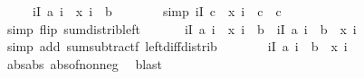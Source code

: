 \begin{isabellebody}
\ \ \ \ \ {\isachardoublequoteopen}{\isasymbar}{\isacharparenleft}{\kern0pt}{\isasymSum}i{\isasymin}I{\isachardot}{\kern0pt}\ a\ i\ {\isacharasterisk}{\kern0pt}\ x\ i{\isacharparenright}{\kern0pt}\ {\isacharminus}{\kern0pt}\ b{\isasymbar}\ {\isasymle}\ {\isasymdelta}{\isachardoublequoteclose}\isanewline
%
\isadelimproof
%
\endisadelimproof
%
\isatagproof
{}\isamarkupfalse%
\ {\isacharminus}{\kern0pt}\isanewline
\ \ \isamarkupfalse%
\ {\isacharbrackleft}{\kern0pt}simp{\isacharbrackright}{\kern0pt}{\isacharcolon}{\kern0pt}\ {\isachardoublequoteopen}{\isacharparenleft}{\kern0pt}{\isasymSum}i{\isasymin}I{\isachardot}{\kern0pt}\ c\ {\isacharasterisk}{\kern0pt}\ x\ i{\isacharparenright}{\kern0pt}\ {\isacharequal}{\kern0pt}\ c{\isachardoublequoteclose}\ \ c\isanewline
\ \ \ \ \isamarkupfalse%
\ {\isacharparenleft}{\kern0pt}simp\ flip{\isacharcolon}{\kern0pt}\ sum{\isacharunderscore}{\kern0pt}distrib{\isacharunderscore}{\kern0pt}left\ {}{\isacharparenright}{\kern0pt}\isanewline
\ \ \isamarkupfalse%
\ \isamarkupfalse%
\ {\isachardoublequoteopen}{\isasymbar}{\isacharparenleft}{\kern0pt}{\isasymSum}i{\isasymin}I{\isachardot}{\kern0pt}\ a\ i\ {\isacharasterisk}{\kern0pt}\ x\ i{\isacharparenright}{\kern0pt}\ {\isacharminus}{\kern0pt}\ b{\isasymbar}\ {\isacharequal}{\kern0pt}\ {\isasymbar}{\isasymSum}i{\isasymin}I{\isachardot}{\kern0pt}\ {\isacharparenleft}{\kern0pt}a\ i\ {\isacharminus}{\kern0pt}\ b{\isacharparenright}{\kern0pt}\ {\isacharasterisk}{\kern0pt}\ x\ i{\isasymbar}{\isachardoublequoteclose}\isanewline
\ \ \ \ \isamarkupfalse%
\ {\isacharparenleft}{\kern0pt}simp\ add{\isacharcolon}{\kern0pt}\ sum{\isacharunderscore}{\kern0pt}subtractf\ left{\isacharunderscore}{\kern0pt}diff{\isacharunderscore}{\kern0pt}distrib{\isacharparenright}{\kern0pt}\isanewline
\ \ \isamarkupfalse%
\ \isamarkupfalse%
\ {\isachardoublequoteopen}{\isasymdots}\ {\isasymle}\ {\isacharparenleft}{\kern0pt}{\isasymSum}i{\isasymin}I{\isachardot}{\kern0pt}\ {\isasymbar}{\isacharparenleft}{\kern0pt}a\ i\ {\isacharminus}{\kern0pt}\ b{\isacharparenright}{\kern0pt}\ {\isacharasterisk}{\kern0pt}\ x\ i{\isasymbar}{\isacharparenright}{\kern0pt}{\isachardoublequoteclose}\isanewline
\ \ \ \ \isamarkupfalse%
\ abs{\isacharunderscore}{\kern0pt}abs\ abs{\isacharunderscore}{\kern0pt}of{\isacharunderscore}{\kern0pt}nonneg\ \isamarkupfalse%
\ blast\isanewline
\ \ \isamarkupfalse%
\ \isamarkupfalse%

\end{isabellebody}
